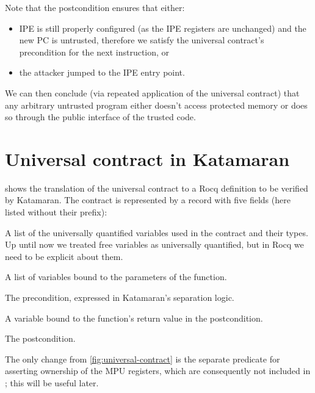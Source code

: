 Note that the postcondition ensures that either:
\begin{itemize}
\item IPE is still properly configured (as the IPE registers are unchanged) and the new PC is untrusted, therefore we satisfy the universal contract's precondition for the next instruction, or
\item the attacker jumped to the IPE entry point.
\end{itemize}
We can then conclude (via repeated application of the universal contract) that any arbitrary untrusted program either doesn't access protected memory or does so through the public interface of the trusted code.

\section{Universal contract in Katamaran}

 shows the translation of the universal contract to a Rocq definition to be verified by Katamaran. The contract is represented by a record with five fields (here listed without their  prefix):
\begin{labeling}{}
\item[\coq{logic_variables}] A list of the universally quantified variables used in the contract and their types. Up until now we treated free variables as universally quantified, but in Rocq we need to be explicit about them.
\item[\coq{localstore}] A list of variables bound to the parameters of the function.
\item[\coq{precondition}] The precondition, expressed in Katamaran's separation logic.

\item[\coq{result}] A variable bound to the function's return value in the postcondition.
\item[\coq{postcondition}] The postcondition.
\end{labeling}

The only change from \cref{fig:universal-contract} is the separate predicate  for asserting ownership of the MPU registers, which are consequently not included in ; this will be useful later.

